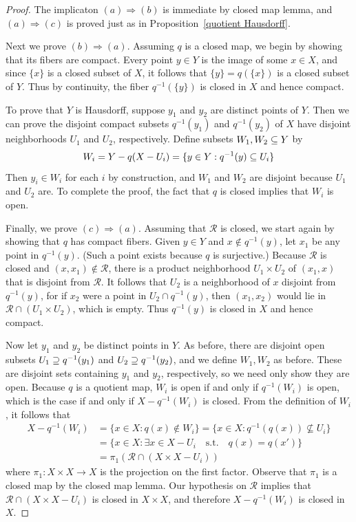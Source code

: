 \begin{proof}
The implicaton $(a)\Rightarrow(b)$ is immediate by closed map lemma, and $(a)\Rightarrow(c)$ is proved just as in Proposition~\ref{quotient Hausdorff}.\par
Next we prove $(b)\Rightarrow(a)$. Assuming $q$ is a closed map, we begin by showing that its fibers are compact. Every point $y\in Y$ is the image of some $x\in X$, and since $\{x\}$ is a closed subset of $X$, it follows that $\{y\}=q(\{x\})$ is a closed subset of $Y$. Thus by continuity, the fiber $q^{-1}(\{y\})$ is closed in $X$ and hence compact.\par 
To prove that $Y$ is Hausdorff, suppose $y_1$ and $y_2$ are distinct points of $Y$. Then we can prove the disjoint compact subsets $q^{-1}(y_1)$ and $q^{-1}(y_2)$ of $X$ have disjoint neighborhoods $U_1$ and $U_2$, respectively. Define subsets $W_1,W_2\subseteq Y$ by
\[W_i=Y-q(X-U_i)=\{y\in Y:q^{-1}(y)\subseteq U_i\}\]
Then $y_i\in W_i$ for each $i$ by construction, and $W_1$ and $W_2$ are disjoint because $U_1$ and $U_2$ are. To complete the proof, the fact that $q$ is closed implies that $W_i$ is open.\par
Finally, we prove $(c)\Rightarrow(a)$. Assuming that $\mathcal{R}$ is closed, we start again by showing that $q$ has compact fibers. Given $y\in Y$ and $x\notin q^{-1}(y)$, let $x_1$ be any point in $q^{-1}(y)$. (Such a point exists because $q$ is surjective.) Because $\mathcal{R}$ is closed and $(x,x_1)\notin\mathcal{R}$, there is a product neighborhood $U_1\times U_2$ of $(x_1,x)$ that is disjoint from $\mathcal{R}$. It follows that $U_2$ is a neighborhood of $x$ disjoint from $q^{-1}(y)$, for if $x_2$ were a point in $U_2\cap q^{-1}(y)$, then $(x_1,x_2)$ would lie in $\mathcal{R}\cap(U_1\times U_2)$, which is empty. Thus $q^{-1}(y)$ is closed in $X$ and hence compact.\par
Now let $y_1$ and $y_2$ be distinct points in $Y$. As before, there are disjoint open
subsets $U_1\supseteq q^{-1}(y_1)$ and $U_2\supseteq q^{-1}(y_2)$, and we define $W_1,W_2$ as before. These are disjoint sets containing $y_1$ and $y_2$, respectively, so we need only show they are open. Because $q$ is a quotient map, $W_i$ is open if and only if $q^{-1}(W_i)$ is open, which is the case if and only if $X-q^{-1}(W_i)$ is closed. From the definition of $W_i$, it follows that
\begin{align*}
X-q^{-1}(W_i)&=\{x\in X:q(x)\notin W_i\}=\{x\in X:q^{-1}(q(x))\nsubseteq U_i\}\\
&=\{x\in X:\exists x\in X-U_i\quad\text{s.t.}\quad q(x)=q(x')\}\\
&=\pi_1(\mathcal{R}\cap(X\times X-U_i))
\end{align*}
where $\pi_1:X\times X\to X$ is the projection on the first factor. Observe that $\pi_1$ is a closed map by the closed map lemma. Our hypothesis on $\mathcal{R}$ implies that $\mathcal{R}\cap(X\times X-U_i)$ is closed in $X\times X$, and therefore $X-q^{-1}(W_i)$ is closed in $X$.
\end{proof}
